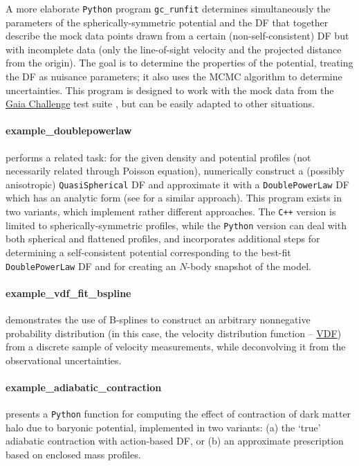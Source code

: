 \documentclass[12pt]{article}
\newcommand{\Cpp}  {\texttt{C++}\xspace}
\newcommand{\Python}{\texttt{Python}\xspace}
\newcommand{\ppp}[1]{\textcolor{darkolive} {\texttt{#1}}}
\let\oldparagraph\paragraph
\renewcommand{\paragraph}[1]{\vspace{-2mm}\oldparagraph{#1}}
\begin{document}
A more elaborate \Python program \texttt{gc_runfit} determines simultaneously the parameters of the spherically-symmetric potential and the DF that together describe the mock data points drawn from a certain (non-self-consistent) DF but with incomplete data (only the line-of-sight velocity and the projected distance from the origin). The goal is to determine the properties of the potential, treating the DF as nuisance parameters; it also uses the MCMC algorithm to determine uncertainties. 
This program is designed to work with the mock data from the \href{http://astrowiki.ph.surrey.ac.uk/dokuwiki/doku.php?id=tests:sphtri:spherical}{Gaia Challenge} test suite \cite{Read2021}, but can be easily adapted to other situations.

\paragraph{example_doublepowerlaw} performs a related task: for the given density and potential profiles (not necessarily related through Poisson equation), numerically construct a (possibly anisotropic) \ppp{QuasiSpherical} DF and approximate it with a \ppp{DoublePowerLaw} DF which has an analytic form (see \cite{Jeffreson2017} for a similar approach). This program exists in two variants, which implement rather different approaches. The \Cpp version is limited to spherically-symmetric profiles, while the \Python version can deal with both spherical and flattened profiles, and incorporates additional steps for determining a self-consistent potential corresponding to the best-fit \ppp{DoublePowerLaw} DF and for creating an $N$-body snapshot of the model.

\paragraph{example_vdf_fit_bspline} demonstrates the use of B-splines to construct an arbitrary nonnegative probability distribution (in this case, the velocity distribution function -- \hyperref[sec:VDF]{VDF}) from a discrete sample of velocity measurements, while deconvolving it from the observational uncertainties.

\paragraph{example_adiabatic_contraction} presents a \Python function for computing the effect of contraction of dark matter halo due to baryonic potential, implemented in two variants: (a) the `true' adiabatic contraction with action-based DF, or (b) an approximate prescription based on enclosed mass profiles.
\end{document}
